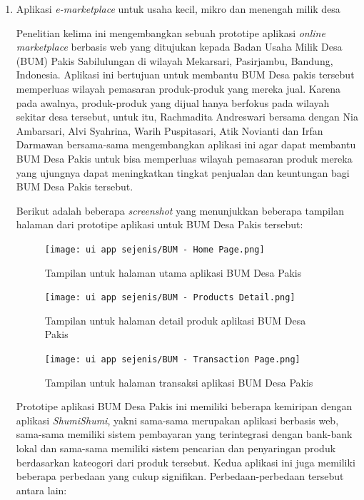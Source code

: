 \documentclass[a4paper]{article}
\begin{document}
\begin{enumerate}
\begin{itemize}
\begin{itemize}
        \end{itemize}

    \end{itemize}

    \item Aplikasi \textit{e-marketplace} untuk usaha kecil, mikro dan menengah milik desa

    Penelitian kelima ini mengembangkan sebuah prototipe aplikasi \textit{online marketplace} berbasis web yang ditujukan kepada Badan Usaha Milik Desa (BUM) Pakis Sabilulungan di wilayah Mekarsari, Pasirjambu, Bandung, Indonesia. Aplikasi ini bertujuan untuk membantu BUM Desa pakis tersebut memperluas wilayah pemasaran produk-produk yang mereka jual. Karena pada awalnya, produk-produk yang dijual hanya berfokus pada wilayah sekitar desa tersebut, untuk itu, Rachmadita Andreswari bersama dengan Nia Ambarsari, Alvi Syahrina, Warih Puspitasari, Atik Novianti dan Irfan Darmawan bersama-sama mengembangkan aplikasi ini agar dapat membantu BUM Desa Pakis untuk bisa memperluas wilayah pemasaran produk mereka yang ujungnya dapat meningkatkan tingkat penjualan dan keuntungan bagi BUM Desa Pakis tersebut\autocite{bum-mekarsari}.

    \newpage
    Berikut adalah beberapa \textit{screenshot} yang menunjukkan beberapa tampilan halaman dari prototipe aplikasi untuk BUM Desa Pakis tersebut:

    \begin{figure}[h]
        \centering
        \texttt{[image: ui app sejenis/BUM - Home Page.png]}
        \caption{Tampilan untuk halaman utama aplikasi BUM Desa Pakis}
    \end{figure}

    \begin{figure}[h]
        \centering
        \texttt{[image: ui app sejenis/BUM - Products Detail.png]}
        \caption{Tampilan untuk halaman detail produk aplikasi BUM Desa Pakis}
    \end{figure}
    \begin{figure}[h]
        \centering
        \texttt{[image: ui app sejenis/BUM - Transaction Page.png]}
        \caption{Tampilan untuk halaman transaksi aplikasi BUM Desa Pakis}
    \end{figure}

    Prototipe aplikasi BUM Desa Pakis ini memiliki beberapa kemiripan dengan aplikasi \textit{ShumiShumi}, yakni sama-sama merupakan aplikasi berbasis web, sama-sama memiliki sistem pembayaran yang terintegrasi dengan bank-bank lokal dan sama-sama memiliki sistem pencarian dan penyaringan produk berdasarkan kateogori dari produk tersebut. Kedua aplikasi ini juga memiliki beberapa perbedaan yang cukup signifikan. Perbedaan-perbedaan tersebut antara lain:


\end{enumerate}
\end{document}
